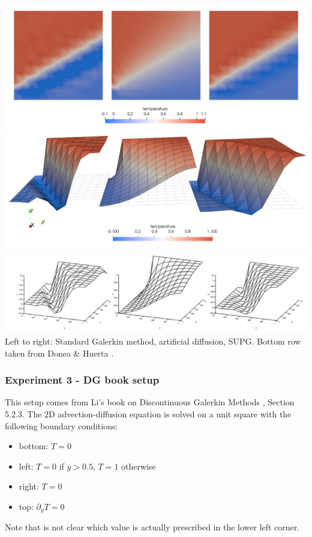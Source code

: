 \begin{center}
\includegraphics[width=15cm]{python_codes/fieldstone_65/results/exp2/Temps2}\\
\includegraphics[width=15cm]{python_codes/fieldstone_65/results/exp2/Temps}\\
\includegraphics[width=15cm]{python_codes/fieldstone_65/images/exp2}\\
{\captionfont Left to right: Standard Galerkin method, artificial diffusion, SUPG. 
Bottom row taken from Donea \& Huerta \cite{dohu03}. }
\end{center}



\subsubsection*{Experiment 3 - DG book setup}

This setup comes from Li's book on Discontinuous Galerkin Methods \cite{li06}, Section 5.2.3.
The 2D advection-diffusion equation is solved on a unit square with the following boundary 
conditions:
\begin{itemize}
\item bottom: $T=0$
\item left: $T=0$ if $y>0.5$, $T=1$ otherwise
\item right: $T=0$
\item top: $\partial_y T=0$
\end{itemize} 
Note that is not clear which value is actually prescribed in the lower left corner. 

